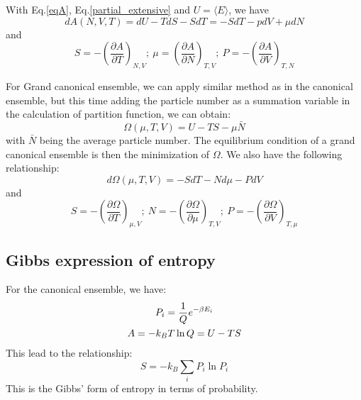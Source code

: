 \documentclass{article}
\begin{document}
With Eq.\ref{eqA}, Eq.\ref{partial_extensive} and $U = \langle E \rangle$,  we have
\begin{equation}
    dA(N,V,T) = dU - TdS - SdT = -SdT - pdV + \mu dN
\end{equation}
and 
\begin{equation}
    S = -\left(\frac{\partial A}{\partial T}\right)_{N,V};\  
    \mu = \left(\frac{\partial A}{\partial N}\right)_{T,V};\ 
    P = -\left(\frac{\partial A}{\partial V}\right)_{T,N}
\end{equation}

For Grand canonical ensemble, we can apply similar method as in the canonical ensemble, but 
this time adding the particle number as a summation variable in the calculation of 
partition function, we can obtain:
\begin{equation}
    \Omega(\mu,T,V) = U - TS - \mu \bar{N}
\end{equation}
with $\bar{N}$ being the average particle number. The equilibrium 
condition of a grand canonical ensemble is then the minimization of $\Omega$. 
We also have the following relationship:
\begin{equation}
    d\Omega(\mu,T,V) = -SdT - Nd\mu - PdV
\end{equation}
and
\begin{equation}
    S = -\left(\frac{\partial \Omega}{\partial T}\right)_{\mu,V};\  
    N = -\left(\frac{\partial \Omega}{\partial \mu}\right)_{T,V};\ 
    P = -\left(\frac{\partial \Omega}{\partial V}\right)_{T,\mu}
\end{equation}

\subsection{Gibbs expression of entropy}
For the canonical ensemble, we have:
\begin{gather}
    P_i = \frac{1}{Q} e^{-\beta E_i} \notag \\
    A = -k_B T\ln Q = U - TS \notag
\end{gather}
This lead to the relationship:
\begin{equation}
    S = -k_B \sum_i P_i \ln P_i
\end{equation}
This is the Gibbs' form of entropy in terms of probability.
\end{document}
